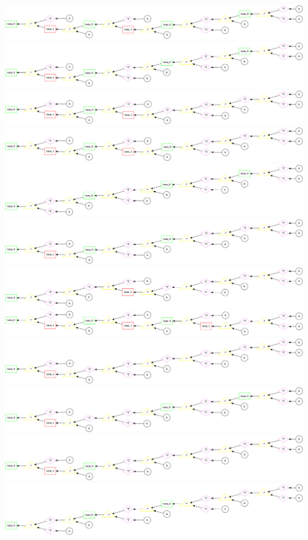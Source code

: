 \begin{center}
\includegraphics[width=0.45\linewidth]{trees/Sym_8_horizontal_0.png}
\includegraphics[width=0.45\linewidth]{trees/Sym_8_horizontal_1.png}
\includegraphics[width=0.45\linewidth]{trees/Sym_8_horizontal_2.png}
\includegraphics[width=0.45\linewidth]{trees/Sym_8_horizontal_3.png}
\includegraphics[width=0.45\linewidth]{trees/Sym_8_horizontal_4.png}
\includegraphics[width=0.45\linewidth]{trees/Sym_8_horizontal_5.png}
\includegraphics[width=0.45\linewidth]{trees/Sym_8_horizontal_6.png}
\includegraphics[width=0.45\linewidth]{trees/Sym_8_horizontal_7.png}
\includegraphics[width=0.45\linewidth]{trees/Sym_8_horizontal_8.png}
\includegraphics[width=0.45\linewidth]{trees/Sym_8_horizontal_9.png}
\includegraphics[width=0.45\linewidth]{trees/Sym_8_horizontal_10.png}
\includegraphics[width=0.45\linewidth]{trees/Sym_8_horizontal_11.png}

\end{center}
